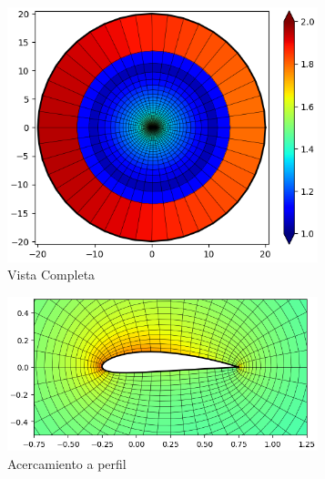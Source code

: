 \documentclass[letterpaper, openright, 12pt]{book}
\begin{document}
    \begin{figure}[htbp!]
        \centering
        \begin{subfigure}[c]{0.48\textwidth}
            \includegraphics[keepaspectratio,
                width=0.99\textwidth]{./img/naca4415_aspect_far}
            \caption{Vista Completa}
            \label{fig:naca4415_aspect_far}
        \end{subfigure}
        \hfill
        \begin{subfigure}[c]{0.48\textwidth}
            \includegraphics[keepaspectratio,
                width=0.99\textwidth]{./img/naca4415_aspect_close}
            \caption{Acercamiento a perfil}
            \label{fig:naca4415_aspect_close}
        \end{subfigure}
        \begin{subfigure}[c]{0.48\textwidth}

\end{subfigure}
\end{figure}
\end{document}

